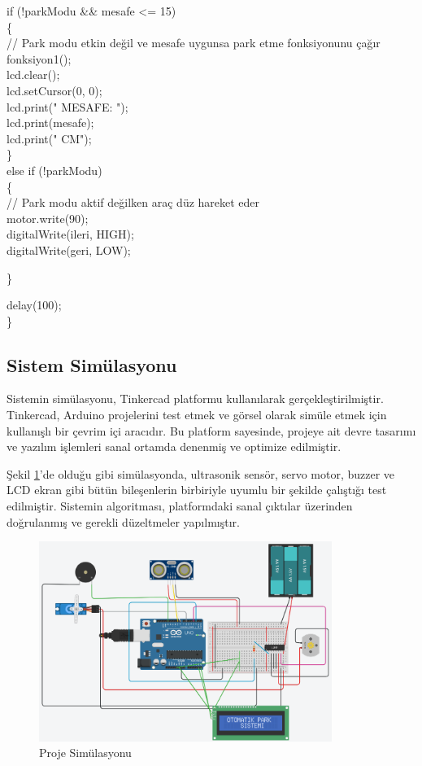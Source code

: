   if (!parkModu \&\& mesafe <= 15)\\
  \{\\
    // Park modu etkin değil ve mesafe uygunsa park etme fonksiyonunu çağır\\
    fonksiyon1();\\
    lcd.clear();\\
    lcd.setCursor(0, 0);\\
    lcd.print("  MESAFE: ");\\
    lcd.print(mesafe);\\
    lcd.print(" CM");\\
  \}\\
  else if (!parkModu)\\ 
  \{\\
    // Park modu aktif değilken araç düz hareket eder\\
    motor.write(90);\\
    digitalWrite(ileri, HIGH);\\
    digitalWrite(geri, LOW);
   
  \}

  delay(100);\\
\}

\subsection{Sistem Simülasyonu}
    Sistemin simülasyonu, Tinkercad platformu kullanılarak gerçekleştirilmiştir. Tinkercad, Arduino projelerini test etmek ve görsel olarak simüle etmek için kullanışlı bir çevrim içi aracıdır. Bu platform sayesinde, projeye ait devre tasarımı ve yazılım işlemleri sanal ortamda denenmiş ve optimize edilmiştir.

    Şekil \ref{fig:24}'de olduğu gibi simülasyonda, ultrasonik sensör, servo motor, buzzer ve LCD ekran gibi bütün bileşenlerin birbiriyle uyumlu bir şekilde çalıştığı test edilmiştir. Sistemin algoritması, platformdaki sanal çıktılar üzerinden doğrulanmış ve gerekli düzeltmeler yapılmıştır.

\begin{figure}[H]
\centering
\includegraphics[width=0.85\textwidth]{Resimler/24.png}
\caption{Proje Simülasyonu}
\label{fig:24}
\end{figure}

